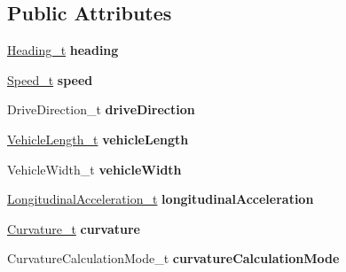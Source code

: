\subsection*{Public Attributes}
\begin{DoxyCompactItemize}
\item 
\hyperlink{structHeading}{Heading\+\_\+t} {\bfseries heading}\hypertarget{structBasicVehicleContainerHighFrequency_a3da2d95a6cd88f63d7659f8ce8a9444f}{}\label{structBasicVehicleContainerHighFrequency_a3da2d95a6cd88f63d7659f8ce8a9444f}

\item 
\hyperlink{structSpeed}{Speed\+\_\+t} {\bfseries speed}\hypertarget{structBasicVehicleContainerHighFrequency_aba254afa65858ceaf785a1c9ab8bd4c7}{}\label{structBasicVehicleContainerHighFrequency_aba254afa65858ceaf785a1c9ab8bd4c7}

\item 
Drive\+Direction\+\_\+t {\bfseries drive\+Direction}\hypertarget{structBasicVehicleContainerHighFrequency_a8094077edb36bab43152dacdadb789cb}{}\label{structBasicVehicleContainerHighFrequency_a8094077edb36bab43152dacdadb789cb}

\item 
\hyperlink{structVehicleLength}{Vehicle\+Length\+\_\+t} {\bfseries vehicle\+Length}\hypertarget{structBasicVehicleContainerHighFrequency_a8094aa684c8b1f7d0d59a3acd94301a4}{}\label{structBasicVehicleContainerHighFrequency_a8094aa684c8b1f7d0d59a3acd94301a4}

\item 
Vehicle\+Width\+\_\+t {\bfseries vehicle\+Width}\hypertarget{structBasicVehicleContainerHighFrequency_a078bd17b5087962c789970dca93bc73d}{}\label{structBasicVehicleContainerHighFrequency_a078bd17b5087962c789970dca93bc73d}

\item 
\hyperlink{structLongitudinalAcceleration}{Longitudinal\+Acceleration\+\_\+t} {\bfseries longitudinal\+Acceleration}\hypertarget{structBasicVehicleContainerHighFrequency_a0d7ab4f2c4dde60ed24367b76730efcd}{}\label{structBasicVehicleContainerHighFrequency_a0d7ab4f2c4dde60ed24367b76730efcd}

\item 
\hyperlink{structCurvature}{Curvature\+\_\+t} {\bfseries curvature}\hypertarget{structBasicVehicleContainerHighFrequency_ab810922ffb3fb3df1f53a0fe46c56be7}{}\label{structBasicVehicleContainerHighFrequency_ab810922ffb3fb3df1f53a0fe46c56be7}

\item 
Curvature\+Calculation\+Mode\+\_\+t {\bfseries curvature\+Calculation\+Mode}\hypertarget{structBasicVehicleContainerHighFrequency_a7a94f0e7628f7f7e73b8596ac8570c60}{}\label{structBasicVehicleContainerHighFrequency_a7a94f0e7628f7f7e73b8596ac8570c60}


\end{DoxyCompactItemize}

